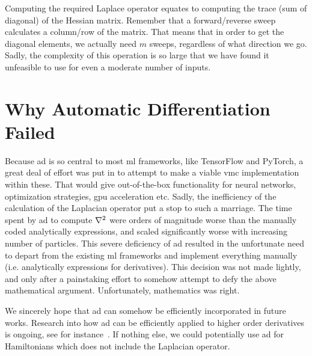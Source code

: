 \documentclass[Thesis.tex]{subfiles}
\begin{document}
Computing the required Laplace operator equates to computing the trace (sum of
diagonal) of the Hessian matrix. Remember that a forward/reverse sweep
calculates a column/row of the matrix. That means that in order to get the
diagonal elements, we actually need $m$ sweeps, regardless of what direction we
go. Sadly, the complexity of this operation is so large that we have found it
unfeasible to use for even a moderate number of inputs.


\section{Why Automatic Differentiation Failed}

Because \gls{ad} is so central to most \gls{ml} frameworks, like TensorFlow and
PyTorch, a great deal of effort was put in to attempt to make a viable \gls{vmc}
implementation within these. That would give out-of-the-box functionality for
neural networks, optimization strategies, \acrshort{gpu} acceleration etc.
Sadly, the inefficiency of the calculation of the Laplacian operator put a stop
to such a marriage. The time spent by \gls{ad} to compute $\laplacian$ were
orders of magnitude worse than the manually coded analytically expressions, and
scaled significantly worse with increasing number of particles. This severe
deficiency of \gls{ad} resulted in the unfortunate need to depart from the
existing \gls{ml} frameworks and implement everything manually (i.e.
analytically expressions for derivatives). This decision was not made lightly,
and only after a painstaking effort to somehow attempt to defy the above
mathematical argument. Unfortunately, mathematics was right.

We sincerely hope that \gls{ad} can somehow be efficiently incorporated in
future works. Research into how \gls{ad} can be efficiently applied to higher
order derivatives is ongoing, see for instance~\textcite{wang2017}. If nothing
else, we could potentially use \gls{ad} for Hamiltonians which does not include
the Laplacian operator.
\end{document}
